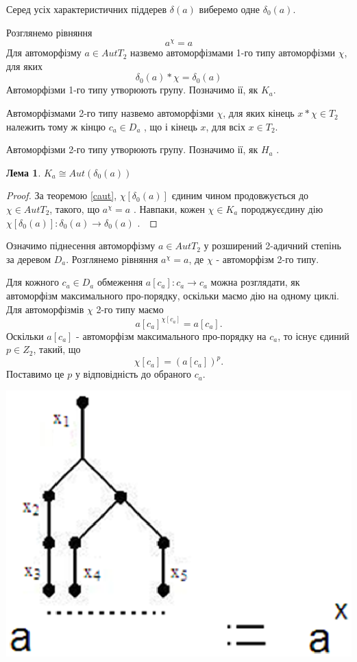 \documentclass[a4paper,12pt]{article} \usepackage{a4wide}
\numberwithin{equation}{subsection}
\newtheorem{lemma}{Лема}[subsection]
\begin{document}
Серед усіх характеристичних піддерев  $\delta (a)$  виберемо одне  $\delta _0(a)$.

 Розглянемо рівняння $$a^\chi=a$$
 Для автоморфізму $a\in AutT_2$  назвемо автоморфізмами 1-го типу автоморфізми
  $\chi$, для яких $$\delta _0(a)\ast \chi=\delta _0(a)$$
   Автоморфізми 1-го типу утворюють групу.
  Позначимо ії, як   $K_a$.


   Автоморфізмами 2-го типу назвемо автоморфізми $\chi$,
  для яких кінець  $x\ast \chi \in T_2$  належить тому ж кінцю $c_a\in D_a$ , що і кінець  $x$,
   для всіх $x\in T_2$.



  Автоморфізми 2-го типу утворюють групу. Позначимо ії, як $H_a$  .
\begin{lemma}
$K_a\cong Aut(\delta _0(a))$
\end{lemma}
\begin{proof}
 За теоремою \eqref{caut}, $\chi [\delta _0(a)]$  єдиним чином продовжується до  $\chi \in AutT_2$,
  такого, що  $a^{\chi}=a$ . Навпаки,  кожен $\chi \in K_a$   породжуєєдину дію
    $\chi [\delta _0(a)]:\delta _0(a)\rightarrow \delta _0(a)$ .\
\end{proof}

 Означимо піднесення автоморфізму  $a \in AutT_2$  у розширений 2-адичний степінь за деревом $D_a$.
Розглянемо рівняння $a^{\chi}=a$,  де $\chi$ - автоморфізм 2-го типу.

 Для кожного  $c_a \in D_a$  обмеження $a[c_a]:c_a\rightarrow c_a$  можна розглядати, як автоморфізм максимального про-порядку,
  оскільки маємо дію на одному циклі. Для автоморфізмів $\chi$ 2-го типу маємо $$a[c_a]^{\chi[c_a]}=a[c_a].$$
Оскільки $a[c_a]$  - автоморфізм максимального про-порядку на $c_a$, то  існує єдиний $ p \in Z_2$, такий, що $$ \chi[c_a]=(a[c_a])^p.$$
 Поставимо це  $p$ у відповідність до обраного $c_a$.

 \begin{center}
\includegraphics[scale=0.6]{deg.eps}
\end{center}
\end{document}
